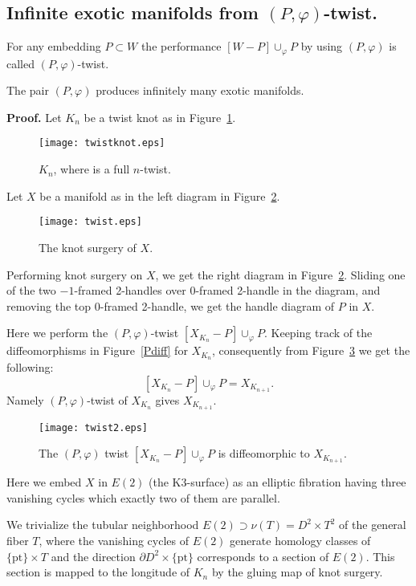 \documentclass[11pt]{amsart}
\begin{document}
\subsection{Infinite exotic manifolds from $(P,\varphi)$-twist.}
For any embedding $P\subset W$ the performance $[W-P]\cup_\varphi P$ by using $(P,\varphi)$ is called $(P,\varphi)$-twist.
\begin{prop}
\label{infinity}
The pair $(P,\varphi)$ produces infinitely many exotic manifolds.
\end{prop}
{{\bf Proof. }}
Let $K_n$ be a twist knot as in Figure~\ref{twistknot}.
\begin{figure}[htbp]
\begin{center}
\texttt{[image: twistknot.eps]}
\caption{$K_n$, where  is a full $n$-twist.}
\label{twistknot}
\end{center}
\end{figure}
Let $X$ be a manifold as in the left diagram in Figure~\ref{X}.
\begin{figure}[htbp]
\begin{center}
\texttt{[image: twist.eps]}
\caption{The knot surgery of $X$.}
\label{X}
\end{center}
\end{figure}
Performing knot surgery on $X$, we get the right diagram in Figure~\ref{X}.
Sliding one of the two $-1$-framed 2-handles over $0$-framed 2-handle in the diagram, and removing the top $0$-framed 2-handle, we get the
handle diagram of $P$ in $X$.

Here we perform the $(P,\varphi)$-twist $[X_{K_n}-P]\cup_\varphi P$.
Keeping track of the diffeomorphisms in Figure~\ref{Pdiff} for $X_{K_n}$,
consequently from Figure~\ref{XX} we get the following:
$$[X_{K_n}-P]\cup_{\varphi}P=X_{K_{n+1}}.$$
Namely $(P,\varphi)$-twist of $X_{K_n}$ gives $X_{K_{n+1}}$.
\begin{figure}[htbp]
\begin{center}
\texttt{[image: twist2.eps]}
\caption{The $(P,\varphi)$ twist $[X_{K_n}-P]\cup_\varphi P$ is diffeomorphic to $X_{K_{n+1}}$.}
\label{XX}
\end{center}
\end{figure}

Here we embed $X$ in $E(2)$ (the K3-surface) as an elliptic fibration having three vanishing cycles
which exactly two of them are parallel.

We trivialize the tubular neighborhood $E(2)\supset \nu(T)=D^2\times T^2$ of the general fiber $T$,
where the vanishing cycles of $E(2)$ generate homology classes of $\{\text{pt}\}\times T$ and the direction 
$\partial D^2\times \{\text{pt}\}$ corresponds to a section of $E(2)$.
This section is mapped to the longitude of $K_n$ by the gluing map of knot surgery.
\end{document}
